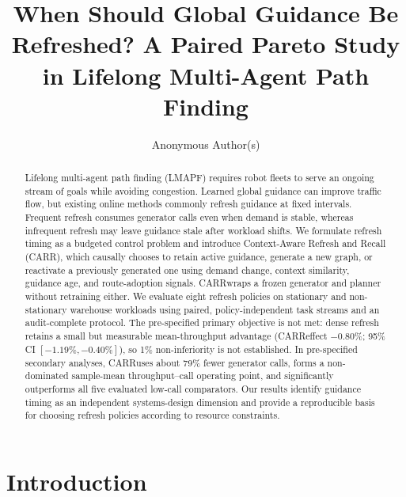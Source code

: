 \documentclass[sigconf,anonymous,review]{acmart}
\newcommand{\carr}{\textsc{CARR}}
\begin{document}
\title{When Should Global Guidance Be Refreshed? A Paired Pareto Study in Lifelong Multi-Agent Path Finding}

\author{Anonymous Author(s)}

\begin{abstract}
Lifelong multi-agent path finding (LMAPF) requires robot fleets to serve an
ongoing stream of goals while avoiding congestion. Learned global guidance can
improve traffic flow, but existing online methods commonly refresh guidance at
fixed intervals. Frequent refresh consumes generator calls even when demand is
stable, whereas infrequent refresh may leave guidance stale after workload
shifts. We formulate refresh timing as a budgeted control problem and
introduce Context-Aware Refresh and Recall (\carr), which causally chooses to
retain active guidance, generate a new graph, or reactivate a previously
generated one using demand change, context similarity, guidance age, and
route-adoption signals. \carr wraps a frozen generator and planner without
retraining either. We evaluate eight refresh policies on stationary and
non-stationary warehouse workloads using
paired, policy-independent task streams and an audit-complete protocol.
The pre-specified primary objective is not met: dense refresh retains a small
but measurable mean-throughput advantage (\carr effect $-0.80\%$; 95\% CI
$[-1.19\%,-0.40\%]$), so 1\% non-inferiority is not established. In
pre-specified secondary analyses, \carr uses about 79\% fewer generator calls,
forms a non-dominated sample-mean throughput--call operating point, and
significantly outperforms all five evaluated low-call comparators. Our results
identify guidance timing as an independent systems-design dimension and
provide a reproducible basis for choosing refresh policies according to
resource constraints.
\end{abstract}



\maketitle

\section{Introduction}
\end{document}
